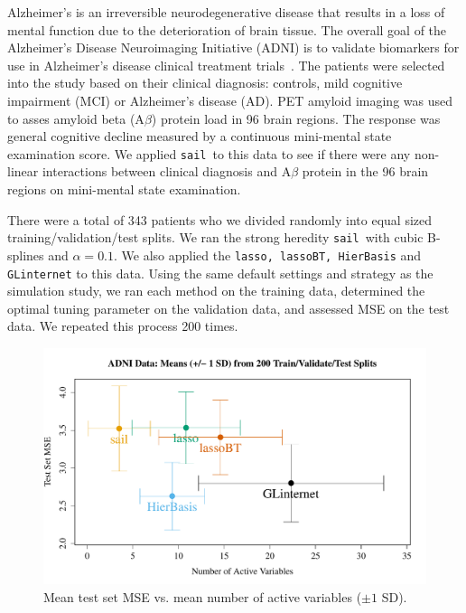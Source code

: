 \documentclass[12pt,letter]{article}\usepackage[]{graphicx}\usepackage[]{color}
\newenvironment{knitrout}{}{} %
\newcommand{\sail}{\texttt{sail}}
\begin{document}
Alzheimer's is an irreversible neurodegenerative disease that results in a loss of mental function due to the deterioration of brain tissue. The overall goal of the Alzheimer's Disease Neuroimaging Initiative (ADNI) is to validate biomarkers for use in
Alzheimer's disease clinical treatment trials~\citep{petersen2010alzheimer}. The patients were selected into the study based on their clinical diagnosis: controls, mild cognitive impairment (MCI) or Alzheimer's disease (AD). PET amyloid imaging was used to asses amyloid beta (A$\beta$) protein load in 96 brain regions. The response was general cognitive decline measured by a continuous mini-mental state examination score. We applied \sail ~to this data to see if there were any non-linear interactions between clinical diagnosis and A$\beta$ protein in the 96 brain regions on mini-mental state examination. 

There were a total of 343 patients who we divided randomly into equal sized training/validation/test splits. We ran the strong heredity \sail ~with cubic B-splines and $\alpha=0.1$. We also applied the \texttt{lasso, lassoBT, HierBasis} and \texttt{GLinternet} to this data. Using the same default settings and strategy as the simulation study, we ran each method on the training data, determined the optimal tuning parameter on the validation data, and assessed MSE on the test data. We repeated this process 200 times. 





\begin{knitrout}\scriptsize
{}\color{fgcolor}\begin{figure}[H]

{\centering \includegraphics[width=1\linewidth]{figure/error-crosses-adni-1} 

}

\caption[Mean test set MSE vs]{Mean test set MSE vs. mean number of active variables ($\pm 1$ SD).}\label{fig:error-crosses-adni}
\end{figure}


\end{knitrout}
\end{document}
